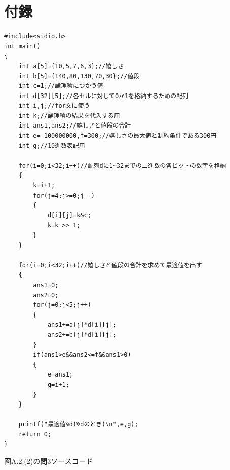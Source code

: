 \documentclass[12pt]{jarticle}
\begin{document}
\section{付録}
\begin{framed}
	\begin{verbatim}
#include<stdio.h>
int main()
{
	int a[5]={10,5,7,6,3};//嬉しさ
	int b[5]={140,80,130,70,30};//値段
	int c=1;//論理積につかう値
	int d[32][5];//各セルに対して0か1を格納するための配列
	int i,j;//for文に使う
	int k;//論理積の結果を代入する用
	int ans1,ans2;//嬉しさと値段の合計
	int e=-100000000,f=300;//嬉しさの最大値と制約条件である300円
	int g;//10進数表記用
			
	for(i=0;i<32;i++)//配列dに1~32までの二進数の各ビットの数字を格納
	{
		k=i+1;
		for(j=4;j>=0;j--)
		{
			d[i][j]=k&c;
			k=k >> 1;
		}
	}
			
	for(i=0;i<32;i++)//嬉しさと値段の合計を求めて最適値を出す
	{
		ans1=0;
		ans2=0;
		for(j=0;j<5;j++)
		{
 			ans1+=a[j]*d[i][j];
			ans2+=b[j]*d[i][j];
		}
		if(ans1>e&&ans2<=f&&ans1>0)
		{
			e=ans1;
			g=i+1;
		}
	}
			
	printf("最適値%d(%dのとき)\n",e,g);
	return 0;
}
    \end{verbatim}
\end{framed}
\begin{center}
	図A.2:(2)の問3ソースコード
\end{center}
\end{document}
